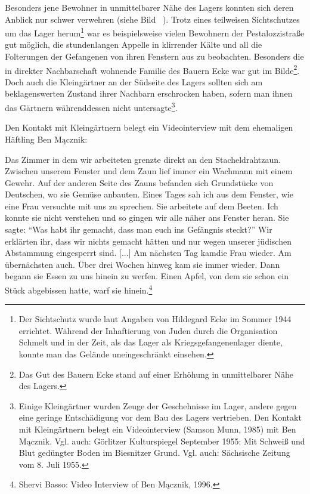 Besonders jene Bewohner in unmittelbarer Nähe des Lagers konnten sich deren Anblick nur schwer verwehren (siehe Bild ~). Trotz eines teilweisen Sichtschutzes um das Lager herum\footnote{Der Sichtschutz wurde laut Angaben von Hildegard Ecke im Sommer 1944 errichtet. Während der Inhaftierung von Juden durch die Organisation Schmelt und in der Zeit, als das Lager als Kriegsgefangenenlager diente, konnte man das Gelände uneingeschränkt einsehen.} war es beispielsweise vielen Bewohnern der Pestalozzistraße gut möglich, die stundenlangen Appelle in klirrender Kälte und all die Folterungen der Gefangenen von ihren Fenstern aus zu beobachten. Besonders die in direkter Nachbarschaft wohnende Familie des Bauern Ecke war gut im Bilde\footnote{Das Gut des Bauern Ecke stand auf einer Erhöhung in unmittelbarer Nähe des Lagers.}. Doch auch die Kleingärtner an der Südseite des Lagers sollten sich am beklagenswerten Zustand ihrer Nachbarn erschrocken haben, sofern man ihnen das Gärtnern währenddessen nicht untersagte\footnote{Einige Kleingärtner wurden Zeuge der Geschehnisse im Lager, andere gegen eine geringe Entschädigung vor dem Bau des Lagers vertrieben. Den Kontakt mit Kleingärtnern belegt ein Videointerview (Samson Munn, 1985) mit Ben Mącznik. Vgl. auch: Görlitzer Kulturspiegel September 1955: Mit Schweiß und Blut gedüngter Boden im Biesnitzer Grund. Vgl. auch: Sächsische Zeitung vom 8. Juli 1955.}.

Den Kontakt mit Kleingärtnern belegt ein Videointerview mit dem ehemaligen Häftling Ben Mącznik:
\begin{leftbar}
Das Zimmer in dem wir arbeiteten grenzte direkt an den Stacheldrahtzaun. Zwischen unserem Fenster und dem Zaun lief immer ein Wachmann mit einem Gewehr. Auf der anderen Seite des Zauns befanden sich Grundstücke von Deutschen, wo sie Gemüse anbauten.
Eines Tages sah ich aus dem Fenster, wie eine Frau versuchte mit uns zu sprechen. Sie arbeitete auf dem Beeten. Ich konnte sie nicht verstehen
und so gingen wir alle näher ans Fenster heran. Sie sagte: {}``Was habt ihr gemacht, dass man euch ins Gefängnis steckt?'' Wir erklärten ihr, dass wir nichts gemacht hätten und nur wegen unserer jüdischen Abstammung eingesperrt sind. {[}...{]} Am nächsten Tag kam\linebreak\newpage die Frau
wieder. Am übernächsten auch. Über drei Wochen hinweg kam sie immer wieder. Dann begann sie Essen zu uns hinein zu werfen. Einen Apfel, von dem sie schon ein Stück abgebissen hatte, warf sie hinein.\footnote{Shervi Basso: Video Interview of Ben Mącznik, 1996.}
\end{leftbar}

